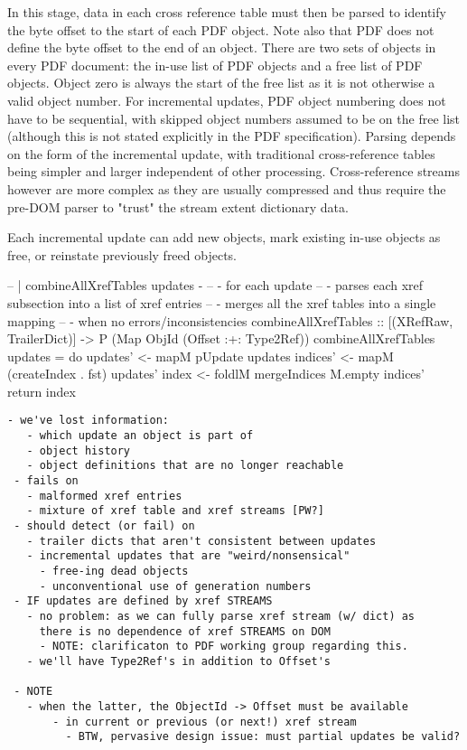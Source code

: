 In this stage, data in each cross reference table must then be parsed to
identify the byte offset to the start of each PDF object. Note also that PDF
does not define the byte offset to the end of an object. There are two sets of
objects in every PDF document: the in-use list of PDF objects and a free list
of PDF objects. Object zero is always the start of the free list as it is not
otherwise a valid object number. For incremental updates, PDF object numbering
does not have to be sequential, with skipped object numbers assumed to be on
the free list (although this is not stated explicitly in the PDF
specification). Parsing depends on the form of the incremental update, with
traditional cross-reference tables being simpler and larger independent of
other processing. Cross-reference streams however are more complex as they are
usually compressed and thus require the pre-DOM parser to "trust" the stream
extent dictionary data.

Each incremental update can add new objects, mark existing in-use objects as
free, or reinstate previously freed objects.

\begin{code}
-- | combineAllXrefTables updates - 
--   - for each update
--     - parses each xref subsection into a list of xref entries
--   - merges all the xref tables into a single mapping
--     - when no errors/inconsistencies
combineAllXrefTables
  :: [(XRefRaw, TrailerDict)] -> P (Map ObjId (Offset :+: Type2Ref))
combineAllXrefTables updates =
  do
  updates' <- mapM pUpdate updates  
  indices' <- mapM (createIndex . fst) updates' 
  index    <- foldlM mergeIndices M.empty indices'
  return index
\end{code}

\begin{lstlisting}[style=meta]
 - we've lost information:
   - which update an object is part of
   - object history
   - object definitions that are no longer reachable
 - fails on
   - malformed xref entries
   - mixture of xref table and xref streams [PW?]
 - should detect (or fail) on
   - trailer dicts that aren't consistent between updates
   - incremental updates that are "weird/nonsensical"
     - free-ing dead objects
     - unconventional use of generation numbers
 - IF updates are defined by xref STREAMS
   - no problem: as we can fully parse xref stream (w/ dict) as
     there is no dependence of xref STREAMS on DOM
     - NOTE: clarificaton to PDF working group regarding this.
   - we'll have Type2Ref's in addition to Offset's
      
 - NOTE 
   - when the latter, the ObjectId -> Offset must be available
       - in current or previous (or next!) xref stream
         - BTW, pervasive design issue: must partial updates be valid?
\end{lstlisting}

